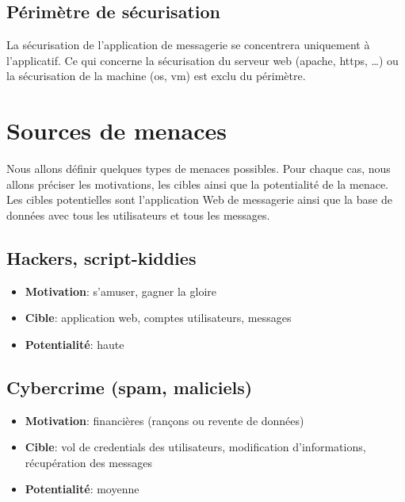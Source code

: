\documentclass[a4paper,10pt]{article}
\begin{document}
    \subsection*{Périmètre de sécurisation}
    La sécurisation de l’application de messagerie se concentrera uniquement à l’applicatif. Ce qui concerne la sécurisation du serveur web (apache, https, …) ou la sécurisation de la machine (os, vm) est exclu du périmètre. 
    \section*{Sources de menaces}
    Nous allons définir quelques types de menaces possibles. Pour chaque cas, nous allons préciser les motivations, les cibles ainsi que la potentialité de la menace. Les cibles potentielles sont l’application Web de messagerie ainsi que la base de données avec tous les utilisateurs et tous les messages.
    \subsection*{Hackers, script-kiddies}
    \begin{onehalfspacing}
    \begin{itemize}
     \item \textbf{Motivation}: s’amuser, gagner la gloire
     \item \textbf{Cible}: application web, comptes utilisateurs, messages
     \item \textbf{Potentialité}: haute
    \end{itemize}
    \end{onehalfspacing}
    \subsection*{Cybercrime (spam, maliciels)}
    \begin{onehalfspacing}
    \begin{itemize}
     \item \textbf{Motivation}: financières (rançons ou revente de données)
     \item \textbf{Cible}: vol de credentials des utilisateurs, modification d’informations, récupération des messages
     \item \textbf{Potentialité}: moyenne
    \end{itemize}
    \end{onehalfspacing}
\end{document}
